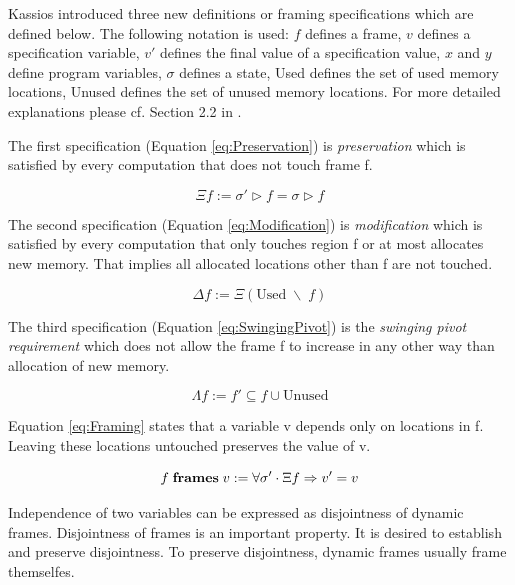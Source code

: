 Kassios introduced three new definitions or framing specifications which are defined below. The following notation is used: $f$ defines a frame, $v$ defines a specification variable, $v'$ defines the final value of a specification value, $x$ and $y$ define program variables, $\sigma$ defines a state, Used defines the set of used memory locations, Unused defines the set of unused memory locations. For more detailed explanations please cf. Section 2.2 in \cite{Kassios06Dynamic}.

The first specification (Equation \ref{eq:Preservation}) is \emph{preservation} which is satisfied by every computation that does not touch frame f.

\begin{equation}
	\Xi f := \sigma' \triangleright f = \sigma \triangleright f
	\label{eq:Preservation}
\end{equation}

The second specification (Equation \ref{eq:Modification}) is \emph{modification} which is satisfied by every computation that only touches region f or at most allocates new memory. That implies all allocated locations other than f are not touched.

\begin{equation}
	\Delta f := \Xi (\text{Used} \; \backslash \; f)
	\label{eq:Modification}
\end{equation}

The third specification (Equation \ref{eq:SwingingPivot}) is the \emph{swinging pivot requirement} which does not allow the frame f to increase in any other way than allocation of new memory.

\begin{equation}
	\Lambda f := f' \subseteq f \cup \text{Unused}
	\label{eq:SwingingPivot}
\end{equation}

Equation \ref{eq:Framing} states that a variable v depends only on locations in f. Leaving these locations untouched preserves the value of v.

\begin{equation}
	f \; \text{\bf{frames}} \; v := \forall \sigma' \cdot \Xi f \Rightarrow v' = v
	\label{eq:Framing}
\end{equation}

Independence of two variables can be expressed as disjointness of dynamic frames. Disjointness of frames is an important property. It is desired to establish and preserve disjointness. To preserve disjointness, dynamic frames usually frame themselfes.

